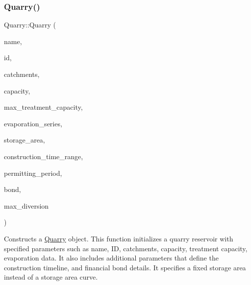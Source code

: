\subsubsection{\texorpdfstring{Quarry()}{Quarry()}\hspace{0.1cm}{\footnotesize\ttfamily [4/5]}}
{\footnotesize\ttfamily Quarry\+::\+Quarry (\begin{DoxyParamCaption}\item[{const char $\ast$}]{name,  }\item[{const int}]{id,  }\item[{const vector$<$ \mbox{\hyperlink{classCatchment}{Catchment}} $\ast$$>$ \&}]{catchments,  }\item[{const double}]{capacity,  }\item[{const double}]{max\+\_\+treatment\+\_\+capacity,  }\item[{Evaporation\+Series \&}]{evaporation\+\_\+series,  }\item[{double}]{storage\+\_\+area,  }\item[{const vector$<$ double $>$ \&}]{construction\+\_\+time\+\_\+range,  }\item[{double}]{permitting\+\_\+period,  }\item[{\mbox{\hyperlink{classBond}{Bond}} \&}]{bond,  }\item[{double}]{max\+\_\+diversion }\end{DoxyParamCaption})}



Constructs a \mbox{\hyperlink{classQuarry}{Quarry}} object. This function initializes a quarry reservoir with specified parameters such as name, ID, catchments, capacity, treatment capacity, evaporation data. It also includes additional parameters that define the construction timeline, and financial bond details. It specifies a fixed storage area instead of a storage area curve. 


